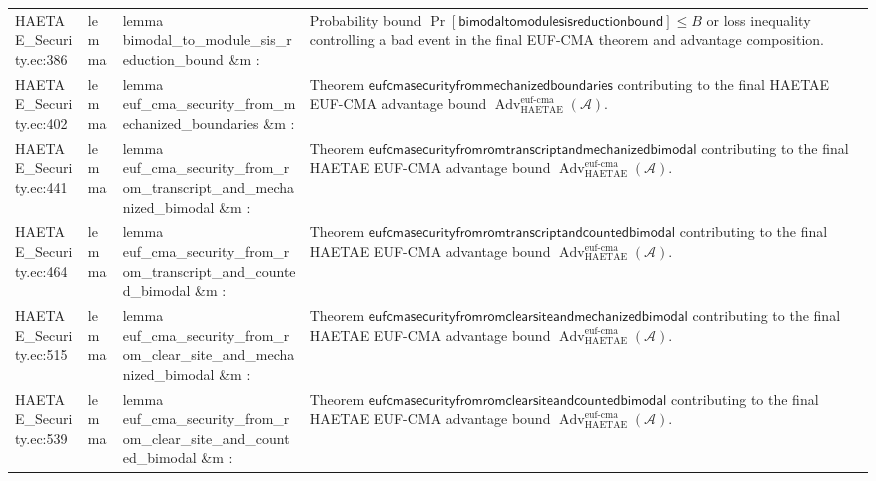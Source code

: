 \documentclass[10pt]{article}
\newcommand{\Adv}{\operatorname{Adv}}
\begin{document}
\begin{longtable}{L{0.11\textwidth}L{0.055\textwidth}L{0.385\textwidth}L{0.41\textwidth}}
HAETAE\_\allowbreak{}Security.\allowbreak{}ec:\allowbreak{}386 & lemma & {\ttfamily\scriptsize lemma bimodal\_\allowbreak{}to\_\allowbreak{}module\_\allowbreak{}sis\_\allowbreak{}reduction\_\allowbreak{}bound \&m :} & Probability bound $\Pr[\mathsf{bimodaltomodulesisreductionbound}]\le B$ or loss inequality controlling a bad event in the final EUF-CMA theorem and advantage composition. \\
HAETAE\_\allowbreak{}Security.\allowbreak{}ec:\allowbreak{}402 & lemma & {\ttfamily\scriptsize lemma euf\_\allowbreak{}cma\_\allowbreak{}security\_\allowbreak{}from\_\allowbreak{}mechanized\_\allowbreak{}boundaries \&m :} & Theorem $\mathsf{eufcmasecurityfrommechanizedboundaries}$ contributing to the final HAETAE EUF-CMA advantage bound $\Adv_{\mathrm{HAETAE}}^{\mathrm{euf\mbox{-}cma}}(\mathcal A)$. \\
HAETAE\_\allowbreak{}Security.\allowbreak{}ec:\allowbreak{}441 & lemma & {\ttfamily\scriptsize lemma euf\_\allowbreak{}cma\_\allowbreak{}security\_\allowbreak{}from\_\allowbreak{}rom\_\allowbreak{}transcript\_\allowbreak{}and\_\allowbreak{}mechanized\_\allowbreak{}bimodal \&m :} & Theorem $\mathsf{eufcmasecurityfromromtranscriptandmechanizedbimodal}$ contributing to the final HAETAE EUF-CMA advantage bound $\Adv_{\mathrm{HAETAE}}^{\mathrm{euf\mbox{-}cma}}(\mathcal A)$. \\
HAETAE\_\allowbreak{}Security.\allowbreak{}ec:\allowbreak{}464 & lemma & {\ttfamily\scriptsize lemma euf\_\allowbreak{}cma\_\allowbreak{}security\_\allowbreak{}from\_\allowbreak{}rom\_\allowbreak{}transcript\_\allowbreak{}and\_\allowbreak{}counted\_\allowbreak{}bimodal \&m :} & Theorem $\mathsf{eufcmasecurityfromromtranscriptandcountedbimodal}$ contributing to the final HAETAE EUF-CMA advantage bound $\Adv_{\mathrm{HAETAE}}^{\mathrm{euf\mbox{-}cma}}(\mathcal A)$. \\
HAETAE\_\allowbreak{}Security.\allowbreak{}ec:\allowbreak{}515 & lemma & {\ttfamily\scriptsize lemma euf\_\allowbreak{}cma\_\allowbreak{}security\_\allowbreak{}from\_\allowbreak{}rom\_\allowbreak{}clear\_\allowbreak{}site\_\allowbreak{}and\_\allowbreak{}mechanized\_\allowbreak{}bimodal \&m :} & Theorem $\mathsf{eufcmasecurityfromromclearsiteandmechanizedbimodal}$ contributing to the final HAETAE EUF-CMA advantage bound $\Adv_{\mathrm{HAETAE}}^{\mathrm{euf\mbox{-}cma}}(\mathcal A)$. \\
HAETAE\_\allowbreak{}Security.\allowbreak{}ec:\allowbreak{}539 & lemma & {\ttfamily\scriptsize lemma euf\_\allowbreak{}cma\_\allowbreak{}security\_\allowbreak{}from\_\allowbreak{}rom\_\allowbreak{}clear\_\allowbreak{}site\_\allowbreak{}and\_\allowbreak{}counted\_\allowbreak{}bimodal \&m :} & Theorem $\mathsf{eufcmasecurityfromromclearsiteandcountedbimodal}$ contributing to the final HAETAE EUF-CMA advantage bound $\Adv_{\mathrm{HAETAE}}^{\mathrm{euf\mbox{-}cma}}(\mathcal A)$. \\

\end{longtable}
\end{document}
